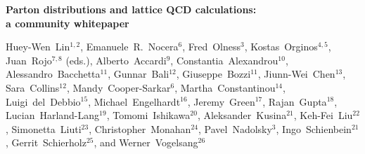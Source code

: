 \documentclass[11pt,a4paper]{article}
\numberwithin{equation}{section}
\numberwithin{figure}{section}
\numberwithin{table}{section}
\begin{document}
\vspace{.3cm}

\begin{center}
{\Large \bf Parton distributions and lattice QCD calculations:\\[0.2cm] a community whitepaper}
\vspace{.4cm}

{\small 
  Huey-Wen~Lin$^{1,2}$,
  Emanuele~R.~Nocera$^6$,
  Fred~Olness$^3$,
  Kostas~Orginos$^{4,5}$,
  Juan~Rojo$^{7,8}$ (eds.),
Alberto~Accardi$^9$, 
Constantia~Alexandrou$^{10}$, 
Alessandro~Bacchetta$^{11}$, 
Gunnar~Bali$^{12}$, 
Giuseppe~Bozzi$^{11}$, 
Jiunn-Wei~Chen$^{13}$, 	
Sara~Collins$^{12}$, 	
Mandy~Cooper-Sarkar$^{6}$, 
Martha~Constantinou$^{14}$, 
Luigi~del~Debbio$^{15}$, 
Michael~Engelhardt$^{16}$, 
Jeremy~Green$^{17}$, 
Rajan~Gupta$^{18}$, 
Lucian~Harland-Lang$^{19}$, 
Tomomi~Ishikawa$^{20}$, 
Aleksander~Kusina$^{21}$, 
Keh-Fei~Liu$^{22}$, 	
Simonetta~Liuti$^{23}$, 		
Christopher~Monahan$^{24}$, 		
Pavel~Nadolsky$^{3}$, 
Ingo~Schienbein$^{21}$, 	
Gerrit~Schierholz$^{25}$, and
Werner~Vogelsang$^{26}$
}


\end{center}
\end{document}
